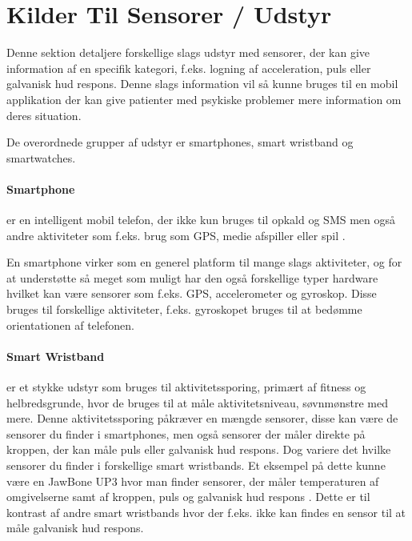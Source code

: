 \section{Kilder Til Sensorer / Udstyr}\label{sec:kilder-til-sensorer}
Denne sektion detaljere forskellige slags udstyr med sensorer, der kan give information af en specifik kategori, f.eks. logning af acceleration, puls eller galvanisk hud respons.
Denne slags information vil så kunne bruges til en mobil applikation der kan give patienter med psykiske problemer mere information om deres situation.

De overordnede grupper af udstyr er smartphones, smart wristband og smartwatches. 

\paragraph{Smartphone}
 er en intelligent mobil telefon, der ikke kun bruges til opkald og SMS men også andre aktiviteter som f.eks. brug som GPS, medie afspiller eller spil \citep{misc:smartphone}.

En smartphone virker som en generel platform til mange slags aktiviteter, og for at understøtte så meget som muligt har den også forskellige typer hardware hvilket kan være sensorer som f.eks. GPS, accelerometer og gyroskop. Disse bruges til forskellige aktiviteter, f.eks. gyroskopet bruges til at bedømme orientationen af telefonen. 

\paragraph{Smart Wristband} %
 er et stykke udstyr som bruges til aktivitetssporing, primært af fitness og helbredsgrunde, hvor de bruges til at måle aktivitetsniveau, søvnmønstre med mere.
Denne aktivitetssporing påkræver en mængde sensorer, disse kan være de sensorer du finder i smartphones, men også sensorer der måler direkte på kroppen, der kan måle puls eller galvanisk hud respons. 
Dog variere det hvilke sensorer du finder i forskellige smart wristbands.
Et eksempel på dette kunne være en JawBone UP3 hvor man finder sensorer, der måler temperaturen af omgivelserne samt af kroppen, puls og galvanisk hud respons \citep{misc:jawboneup3sensors}. 
Dette er til kontrast af andre smart wristbands hvor der f.eks. ikke kan findes en sensor til at måle galvanisk hud respons.

